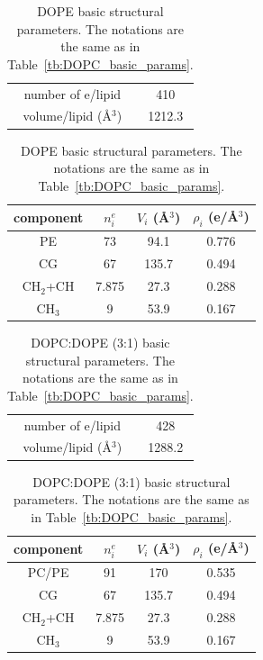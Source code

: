 \begin{table}[htbp]
  \centering
  \begin{tabular}{ cc }
  \hline
    number of e/lipid & 410 \\ 
    volume/lipid (\AA$^3$) & 1212.3 \\
  \hline
  \end{tabular}
  \quad
  \begin{tabular}{ cccc }
    \hline
    component & $n^e_i$ & $V_i$ (\AA$^3$) & $\rho_i$ (e/\AA$^3$) \\
    \hline 
    PE & 73 & 94.1 & 0.776 \\  
    CG & 67 & 135.7 & 0.494 \\  
    CH$_2$+CH & 7.875 & 27.3 & 0.288 \\
    CH$_3$ & 9 & 53.9 & 0.167 \\
    \hline
  \end{tabular}
  \caption{DOPE basic structural parameters. The notations are the same
  as in Table~\ref{tb:DOPC_basic_params}.}
  \label{tb:DOPE_basic_params}
\end{table}
\begin{table}[htbp]
  \centering
  \begin{tabular}{ cc }
  \hline
    number of e/lipid & 428 \\ 
    volume/lipid (\AA$^3$) & 1288.2 \\
  \hline
  \end{tabular}
  \quad
  \begin{tabular}{ cccc }
    \hline
    component & $n^e_i$ & $V_i$ (\AA$^3$) & $\rho_i$ (e/\AA$^3$) \\
    \hline 
    PC/PE & 91 & 170 & 0.535 \\  
    CG & 67 & 135.7 & 0.494 \\  
    CH$_2$+CH & 7.875 & 27.3 & 0.288 \\
    CH$_3$ & 9 & 53.9 & 0.167 \\
    \hline
  \end{tabular}
  \caption{DOPC:DOPE (3:1) basic structural parameters. The notations are the same
  as in Table~\ref{tb:DOPC_basic_params}.}
  \label{tb:PCPE3:1_basic_params}
\end{table}

